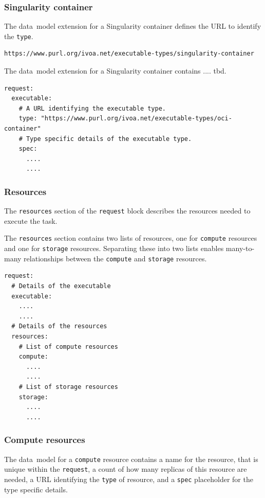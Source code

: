\documentclass[11pt,a4paper]{ivoa}
\newcommand{\datamodel} {data~model}
\newcommand{\singularity} {Singularity}
\newcommand{\codeword}[1] {\texttt{#1}}
\begin{document}
\subsubsection{Singularity container}
\label{datamodel-singularity-container}

The \datamodel{} extension for a \singularity{} container defines the URL
to identify the \codeword{type}.

\begin{lstlisting}[]
https://www.purl.org/ivoa.net/executable-types/singularity-container
\end{lstlisting}

The \datamodel{} extension for a \singularity{} container contains .... tbd.

\begin{lstlisting}[]
request:
  executable:
    # A URL identifying the executable type.
    type: "https://www.purl.org/ivoa.net/executable-types/oci-container"
    # Type specific details of the executable type.
    spec:
      ....
      ....
\end{lstlisting}

\subsubsection{Resources}
\label{datamodel-resources}

The \codeword{resources} section of the \codeword{request} block describes the resources needed
to execute the task.

The \codeword{resources} section contains two lists of resources, one for
\codeword{compute} resources and one for \codeword{storage} resources.
Separating these into two lists enables many-to-many relationships between the \codeword{compute}
and \codeword{storage} resources.

\begin{lstlisting}[]
request:
  # Details of the executable
  executable:
    ....
    ....
  # Details of the resources
  resources:
    # List of compute resources
    compute:
      ....
      ....
    # List of storage resources
    storage:
      ....
      ....
\end{lstlisting}

\subsubsection{Compute resources}
\label{datamodel-compute-resources}

The \datamodel{} for a \codeword{compute} resource contains
a name for the resource, that is unique within the \codeword{request},
a count of how many replicas of this resource are needed,
a URL identifying the \codeword{type} of resource,
and a \codeword{spec} placeholder for the type specific details.
\end{document}
